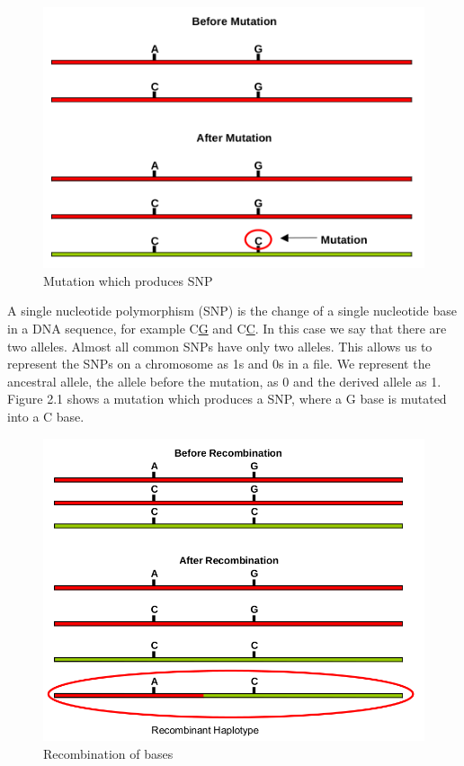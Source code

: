 \documentclass[a4paper,12pt]{report}
\begin{document}
\begin{figure}[h!]
  \centering
    \includegraphics[scale=0.2]{SNP}
  \caption{Mutation which produces SNP}
\end{figure}

A single nucleotide polymorphism (SNP) is the change of a single nucleotide base in a DNA sequence, for example C\underline{G} and C\underline{C}. In this case we say that there are two alleles. Almost all common SNPs have only two alleles. This allows us to represent the SNPs on a chromosome as 1s and 0s in a file. We represent the ancestral allele, the allele before the mutation, as 0 and the derived allele as 1.\cite{selscan} Figure 2.1 shows a mutation which produces a SNP, where a G base is mutated into a C base.

\begin{figure}[h!]
  \centering
    \includegraphics[scale=0.25]{recombination1}
  \caption{Recombination of bases}
\end{figure}
\end{document}
